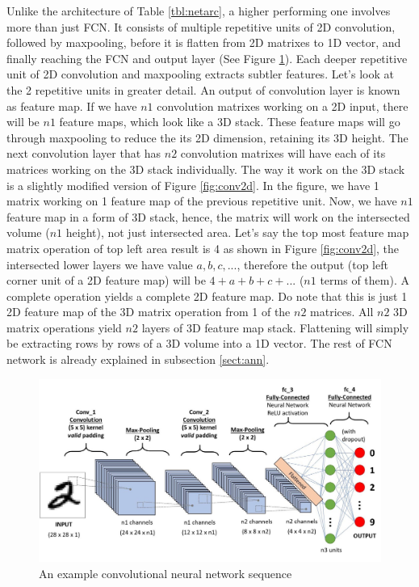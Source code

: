 Unlike the architecture of Table \ref{tbl:netarc}, a higher performing one involves more than just FCN. It consists of multiple repetitive units of 2D convolution, followed by maxpooling, before it is flatten from 2D matrixes to 1D vector, and finally reaching the FCN and output layer (See Figure \ref{fig:cnnseq}). Each deeper repetitive unit of 2D convolution and maxpooling extracts subtler features. Let's look at the 2 repetitive units in greater detail. An output of convolution layer is known as feature map. If we have $n1$ convolution matrixes working on a 2D input, there will be $n1$ feature maps, which look like a 3D stack. These feature maps will go through maxpooling to reduce the its 2D dimension, retaining its 3D height. The next convolution layer that has $n2$ convolution matrixes will have each of its matrices working on the 3D stack individually. The way it work on the 3D stack is a slightly modified version of Figure \ref{fig:conv2d}. In the figure, we have 1 matrix working on 1 feature map of the previous repetitive unit. Now, we have $n1$ feature map in a form of 3D stack, hence, the matrix will work on the intersected volume ($n1$ height), not just intersected area. Let's say the top most feature map matrix operation of top left area result is 4 as shown in Figure \ref{fig:conv2d}, the intersected lower layers we have value $a,b,c,...$, therefore the output (top left corner unit of a 2D feature map) will be $4+a+b+c+...$ ($n1$ terms of them). A complete operation yields a complete 2D feature map. Do note that this is just 1 2D feature map of the 3D matrix operation from 1 of the $n2$ matrices.  All $n2$ 3D matrix operations yield $n2$ layers of 3D feature map stack. Flattening will simply be extracting rows by rows of a 3D volume into a 1D vector. The rest of FCN network is already explained in subsection \ref{sect:ann}.
\begin{figure}[H]
	\centering
	\includegraphics[scale=0.3]{cnnsequence.jpeg}
	\caption{An example convolutional neural network sequence}
	\label {fig:cnnseq}
\end{figure}
